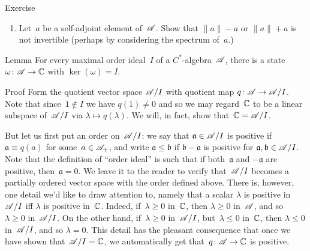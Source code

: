 \documentclass[a]{subfiles}
\begin{document}
\begin{parsec}
\begin{point}{Exercise}
\begin{enumerate}
\item
Let~$a$ be a self-adjoint element of~$\mathscr{A}$.
Show that  $\|a\|-a$
or $\|a\|+a$ is not invertible
(perhaps by considering the spectrum of~$a$.)
\end{enumerate}
\end{point}
\begin{point}{Lemma}%
For every maximal order ideal~$I$ of a $C^*$-algebra~$\mathscr{A}$,
 there is a state $\omega \colon \mathscr{A}\to \mathbb{C}$
with $\ker(\omega)=I$.
\begin{point}{Proof}%
Form the quotient vector space $\mathscr{A}/I$
with quotient map $q\colon \mathscr{A}\to \mathscr{A}/I$.
Note that since~$1\notin I$
we have $q(1)\neq 0$
and so we may regard~$\mathbb{C}$ 
to be a linear subspace of~$\mathscr{A}/I$
via $\lambda\mapsto q(\lambda)$.
We will, in fact, show that~$\mathbb{C}=\mathscr{A}/I$.

But let us first put an order on~$\mathscr{A}/I$:
we say that $\mathfrak{a}\in \mathscr{A}/I$ is positive
if $\mathfrak{a}\equiv q(a)$ for some~$a\in\mathscr{A}_{+}$,
and write $\mathfrak{a}\leq \mathfrak{b}$ 
if $\mathfrak{b}-\mathfrak{a}$ is positive
for $\mathfrak{a},\mathfrak{b}\in\mathscr{A}/I$.
Note that the definition of ``order ideal'' is such
that if both~$\mathfrak{a}$ and $-\mathfrak{a}$ are positive,
then~$\mathfrak{a}=0$.
We leave it to the reader to verify 
that~$\mathscr{A}/I$ becomes a partially ordered vector space
with the order defined above.
There is, however,
one detail we'd like to draw attention to,
namely that a scalar $\lambda$ is positive in~$\mathscr{A}/I$
iff $\lambda$ is positive in~$\mathbb{C}$.
Indeed, if~$\lambda\geq 0$ in~$\mathbb{C}$,
then $\lambda\geq 0$ in~$\mathscr{A}$, and so~$\lambda \geq 0$ in~$\mathscr{A}/I$.
On the other hand,
if~$\lambda\geq 0$ in~$\mathscr{A}/I$, but~$\lambda\leq 0$ in~$\mathbb{C}$,
then $\lambda\leq 0$ in~$\mathscr{A}/I$,
and so $\lambda=0$.
This detail
has the pleasant consequence
that once we have shown that~$\mathscr{A}/I=\mathbb{C}$,
we automatically get that~$q\colon \mathscr{A}\to\mathbb{C}$ is positive.


\end{point}
\end{point}
\end{parsec}
\end{document}
